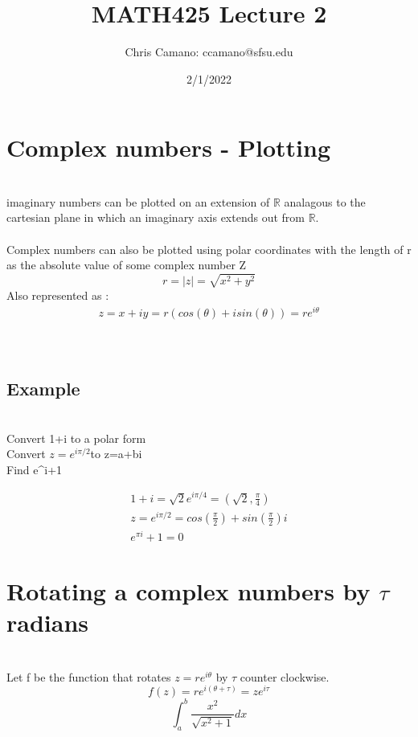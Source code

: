 \documentclass[12pt,a4paper]{article}
\author{Chris Camano: ccamano@sfsu.edu}
\title{MATH425 Lecture 2 }
\date{2/1/2022}
\begin{document}
\maketitle

\section{Complex numbers - Plotting}\\
imaginary numbers can be plotted on an extension of $\mathbb{R}$ analagous to the cartesian plane in which an imaginary axis extends out from $\mathbb{R}$. \\\\
Complex numbers can also be plotted using polar coordinates with the length of r as the absolute value of some complex number Z\\
\[
  r=|z|=\sqrt{x^2+y^2}
\]
Also represented as :
\begin{align*}
  z=x+iy=r(cos(\theta)+isin(\theta))=re^{i\theta}
\end{align*}
\\\\
\subsection{Example}\\
Convert 1+i to a polar form\\
Convert $z=e^{i\pi/2}$to z=a+bi\\
Find e^{\pi i}+1

\begin{align*}
  1+i=\sqrt{2}e^{i\pi /4}=(\sqrt{2},\frac{\pi}{4})\\
  z=e^{i\pi/2}=cos(\frac{\pi}{2})+sin(\frac{\pi}{2})i\\
  e^{\pi i}+1=0
\end{align*}
\section{Rotating a complex numbers by $\tau$ radians}\\
Let f be the function that rotates $z=re^{i\theta}$ by $\tau$ counter clockwise. \\
\[
  f(z)= re^{i(\theta+\tau)}=ze^{i\tau}
\]
\[
  \int_a^b \frac{x^2}{\sqrt{x^2+1}}dx
\]
\end{document}
